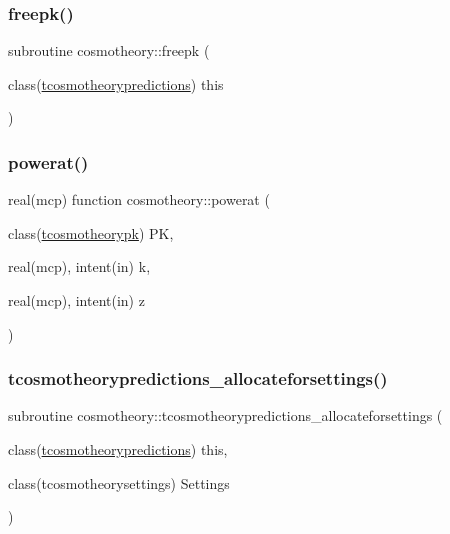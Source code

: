 \subsubsection{\texorpdfstring{freepk()}{freepk()}}
{\footnotesize\ttfamily subroutine cosmotheory\+::freepk (\begin{DoxyParamCaption}\item[{class(\mbox{\hyperlink{structcosmotheory_1_1tcosmotheorypredictions}{tcosmotheorypredictions}})}]{this }\end{DoxyParamCaption})\hspace{0.3cm}{\ttfamily [private]}}

\mbox{\label{namespacecosmotheory_a6c9071e7ff33914f7d9957dcf8790938}} 
\subsubsection{\texorpdfstring{powerat()}{powerat()}}
{\footnotesize\ttfamily real(mcp) function cosmotheory\+::powerat (\begin{DoxyParamCaption}\item[{class(\mbox{\hyperlink{structcosmotheory_1_1tcosmotheorypk}{tcosmotheorypk}})}]{PK,  }\item[{real(mcp), intent(in)}]{k,  }\item[{real(mcp), intent(in)}]{z }\end{DoxyParamCaption})\hspace{0.3cm}{\ttfamily [private]}}

\mbox{\label{namespacecosmotheory_a6d0d95c32ef1d72829beee8c549606d9}} 
\subsubsection{\texorpdfstring{tcosmotheorypredictions\+\_\+allocateforsettings()}{tcosmotheorypredictions\_allocateforsettings()}}
{\footnotesize\ttfamily subroutine cosmotheory\+::tcosmotheorypredictions\+\_\+allocateforsettings (\begin{DoxyParamCaption}\item[{class(\mbox{\hyperlink{structcosmotheory_1_1tcosmotheorypredictions}{tcosmotheorypredictions}})}]{this,  }\item[{class(tcosmotheorysettings)}]{Settings }\end{DoxyParamCaption})\hspace{0.3cm}{\ttfamily [private]}}

